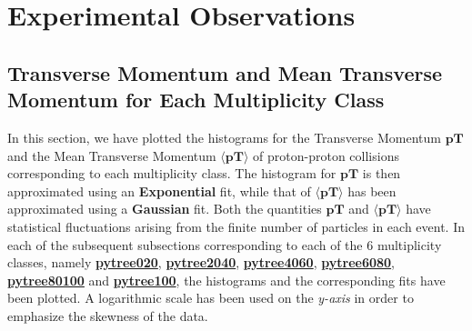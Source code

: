 \documentclass[letterpaper,aps,prc,superscriptaddress,nofootinbib,10pt,showpacs,floatfix]{revtex4-2}%
\begin{document}
\vspace{-3mm}

\section{Experimental Observations }














\subsection{Transverse Momentum and Mean Transverse Momentum for Each Multiplicity Class}
In this section, we have plotted the histograms for the Transverse Momentum $\mathbf{pT}$ and the Mean Transverse Momentum $\mathbf{\langle pT\rangle }$ of proton-proton collisions corresponding to each multiplicity class. The histogram for $\mathbf{pT}$ is then approximated using an \textbf{Exponential} fit, while that of $\mathbf{\langle pT\rangle }$ has been approximated using a \textbf{Gaussian} fit. Both the quantities $\mathbf{pT}$ and $\mathbf{\langle pT\rangle }$ have statistical fluctuations arising from the finite number of particles in each event. In each of the subsequent subsections corresponding to each of the 6 multiplicity classes, namely \hyperref[subsubsec:020]{\textbf{pytree020}}, \hyperref[subsubsec:2040]{\textbf{pytree2040}}, \hyperref[subsubsec:4060]{\textbf{pytree4060}}, \hyperref[subsubsec:6080]{\textbf{pytree6080}}, \hyperref[subsubsec:80100]{\textbf{pytree80100}} and \hyperref[subsubsec:100]{\textbf{pytree100}}, the histograms and the corresponding fits have been plotted. A logarithmic scale has been used on the \emph{y-axis} in order to emphasize the skewness of the data. 
\end{document}
